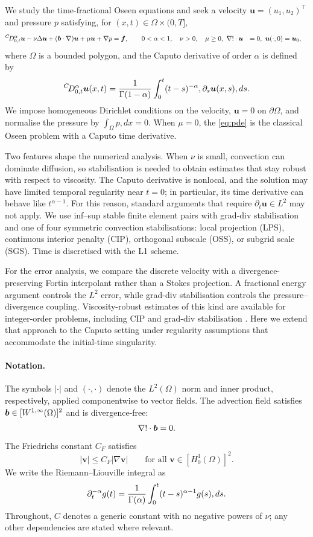 We study the time-fractional Oseen equations and seek a velocity $\bm u=(u_1,u_2)^\top$ and pressure $p$ satisfying, for $(x,t)\in\Omega\times(0,T]$,
\begin{equation}\label{eq:pde}
\begin{aligned}
{}^{C}\!D_{0,t}^{\alpha}\bm u-\nu\Delta\bm u+(\boldsymbol b\cdot\nabla)\bm u+\mu\bm u+\nabla p&=\bm f, \qquad 0<\alpha<1,\quad \nu>0,\quad \mu\ge0,\
\nabla!\cdot\bm u&=0,\
\bm u(\cdot,0)&=\bm u_0,
\end{aligned}
\end{equation}
where $\Omega$ is a bounded polygon, and the Caputo derivative of order $\alpha$ is defined by
\begin{equation}\label{eq:caputo}
{}^{C}\!D_{0,t}^{\alpha}\bm u(x,t)=\frac{1}{\Gamma(1-\alpha)}\int_0^t(t-s)^{-\alpha},\partial_s\bm u(x,s),ds .
\end{equation}
We impose homogeneous Dirichlet conditions on the velocity, $\bm u=0$ on $\partial\Omega$, and normalise the pressure by $\int_\Omega p,dx=0$. When $\mu=0$, the \eqref{eq:pde} is the classical Oseen problem with a Caputo time derivative.

Two features shape the numerical analysis. When $\nu$ is small, convection can dominate diffusion, so stabilisation is needed to obtain estimates that stay robust with respect to viscosity. The Caputo derivative is nonlocal, and the solution may have limited temporal regularity near $t=0$; in particular, its time derivative can behave like $t^{\alpha-1}$. For this reason, standard arguments that require $\partial_t\bm u\in L^2$ may not apply. We use inf–sup stable finite element pairs with grad-div stabilisation and one of four symmetric convection stabilisations: local projection (LPS), continuous interior penalty (CIP), orthogonal subscale (OSS), or subgrid scale (SGS). Time is discretised with the L1 scheme.

For the error analysis, we compare the discrete velocity with a divergence-preserving Fortin interpolant rather than a Stokes projection. A fractional energy argument controls the $L^2$ error, while grad-div stabilisation controls the pressure–divergence coupling. Viscosity-robust estimates of this kind are available for integer-order problems, including CIP \cite{BF07} and grad-div stabilisation \cite{dFGJN}. Here we extend that approach to the Caputo setting under regularity assumptions that accommodate the initial-time singularity.

\paragraph{Notation.}
The symbols $|\cdot|$ and $(\cdot,\cdot)$ denote the $L^2(\Omega)$ norm and inner product, respectively, applied componentwise to vector fields. The advection field satisfies $\boldsymbol b\in[W^{1,\infty}(\Omega)]^2$ and is divergence-free:
\[
\nabla!\cdot\boldsymbol b=0 .
\]
The Friedrichs constant $C_F$ satisfies
\[
|\bm v|\le C_F|\nabla\bm v|\qquad\text{for all }\bm v\in[H^1_0(\Omega)]^2 .
\]
We write the Riemann–Liouville integral as
\[
\partial_t^{-\alpha} g(t)=\frac1{\Gamma(\alpha)}\int_0^t(t-s)^{\alpha-1}g(s),ds .
\]
Throughout, $C$ denotes a generic constant with no negative powers of $\nu$; any other dependencies are stated where relevant.


